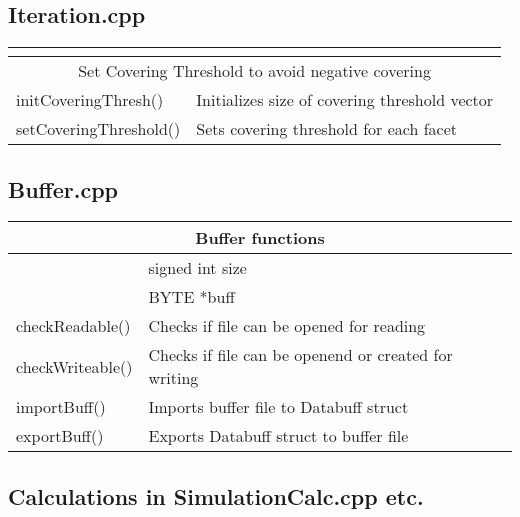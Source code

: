 \subsection{Iteration.cpp}
\begin{center}
\begin{tabular}{|l|l|}
\multicolumn{2}{l}{}\\
\hline
\multicolumn{2}{|c|}{\rule{0pt}{3ex}Set Covering Threshold to avoid negative covering}\\
\hline
\rule{0pt}{3ex} initCoveringThresh()& Initializes size of covering threshold vector\\
\rule{0pt}{3ex} setCoveringThreshold()& Sets covering threshold for each facet\\
\hline
\end{tabular}
\end{center}

\subsection{Buffer.cpp}
\begin{center}
\begin{tabular}{|l|l|}
\hline
\multicolumn{2}{|c|}{\rule{0pt}{3ex}Buffer functions}\\
\hline
\rule{0pt}{3ex}  \multirow{2}{*}{Databuff struct()}& signed int size \\& BYTE *buff\\
\hline
\rule{0pt}{3ex} checkReadable()& Checks if file can be opened for reading\\
\rule{0pt}{3ex} checkWriteable()&  Checks if file can be openend or created for writing\\
\rule{0pt}{3ex} importBuff()& Imports buffer file to Databuff struct\\
\rule{0pt}{3ex} exportBuff()&  Exports Databuff struct to buffer file\\
\hline
\end{tabular}
\end{center}

\subsection{Calculations in SimulationCalc.cpp etc.}

